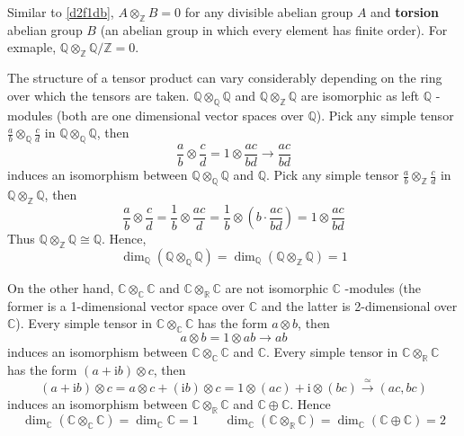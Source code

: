 \begin{example}
Similar to \cref{d2f1db}, $A\otimes_{\mathbb{Z}}B=0$ for any divisible abelian group $A$ and \textbf{torsion} abelian group $B$ (an abelian group in which every element has finite order). For exmaple, $\mathbb{Q}\otimes_{\mathbb{Z}}\mathbb{Q}/\mathbb{Z}=0$.
\end{example}
\begin{example}[dimension]
The structure of a tensor product can vary considerably depending on the ring over which the tensors are taken. $\mathbb{Q}\otimes_{\mathbb{Q}}\mathbb{Q}$ and $\mathbb{Q}\otimes_{\mathbb{Z}}\mathbb{Q}$ are isomorphic as left $\mathbb{Q}$ -modules (both are one dimensional vector spaces over $\mathbb{Q}$). Pick any simple tensor $\frac{a}{b}\otimes_{\mathbb{Q}} \frac{c}{d}$ in $\mathbb{Q}\otimes_{\mathbb{Q}}\mathbb{Q}$, then
\[
\frac{a}{b}\otimes \frac{c}{d}=1\otimes \frac{ac}{bd}\to\frac{ac}{bd}
\]
induces an isomorphism between $\mathbb{Q}\otimes_{\mathbb{Q}}\mathbb{Q}$ and $\mathbb{Q}$. Pick any simple tensor $\frac{a}{b}\otimes_{\mathbb{Z}}\frac{c}{d}$ in $\mathbb{Q}\otimes_{\mathbb{Z}}\mathbb{Q}$, then
\[
\frac{a}{b}\otimes \frac{c}{d}=\frac{1}{b}\otimes \frac{ac}{d}=\frac{1}{b}\otimes \left( b\cdot\frac{ac}{bd} \right)=1\otimes \frac{ac}{bd}
\]
Thus $\mathbb{Q}\otimes_{\mathbb{Z}}\mathbb{Q}\cong \mathbb{Q}$. Hence,
\[
\dim _{\mathbb{Q}}(\mathbb{Q}\otimes _{\mathbb{Q}}\mathbb{Q})=\dim _{\mathbb{Q}}(\mathbb{Q}\otimes _{\mathbb{Z}}\mathbb{Q})=1
\]
\end{example}
\begin{example}
On the other hand, $\mathbb{C}\otimes_{\mathbb{C}}\mathbb{C}$ and $\mathbb{C}\otimes_{\mathbb{R}}\mathbb{C}$ are not isomorphic $\mathbb{C}$ -modules (the former is a 1-dimensional vector space over $\mathbb{C}$ and the latter is 2-dimensional over $\mathbb{C}$). Every simple tensor in $\mathbb{C}\otimes_{\mathbb{C}}\mathbb{C}$ has the form $a\otimes b$, then
\[
a\otimes b=1\otimes ab\to ab
\]
induces an isomorphism between $\mathbb{C}\otimes_{\mathbb{C}}\mathbb{C}$ and $\mathbb{C}$. Every simple tensor in $\mathbb{C}\otimes_{\mathbb{R}}\mathbb{C}$ has the form $(a+\mathrm{i}b)\otimes c$, then
\[
(a+\mathrm{i}b)\otimes c=a\otimes c+(\mathrm{i}b)\otimes c=1\otimes (ac)+\mathrm{i}\otimes (bc)\overset{ \simeq  }{ \longrightarrow  }(ac,bc)
\]
induces an isomorphism between $\mathbb{C}\otimes_{\mathbb{R}}\mathbb{C}$ and $\mathbb{C}\oplus \mathbb{C}$. Hence
\[
\dim_{\mathbb{C}} (\mathbb{C}\otimes _{\mathbb{C}}\mathbb{C})=\dim _{\mathbb{C}}\mathbb{C}=1\qquad \dim _{\mathbb{C}}(\mathbb{C}\otimes _{\mathbb{R}}\mathbb{C})=\dim _{\mathbb{C}}(\mathbb{C}\oplus \mathbb{C})=2
\]
\end{example}
